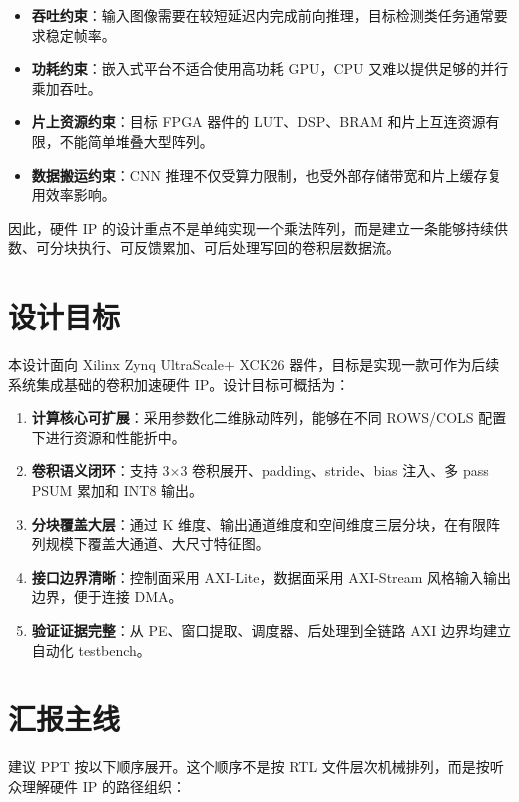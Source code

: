 \documentclass[fontset=fandol,ugly,language=chinese]{pkuthss}
\begin{document}
\begin{itemize}
    \item \textbf{吞吐约束}：输入图像需要在较短延迟内完成前向推理，目标检测类任务通常要求稳定帧率。
    \item \textbf{功耗约束}：嵌入式平台不适合使用高功耗 GPU，CPU 又难以提供足够的并行乘加吞吐。
    \item \textbf{片上资源约束}：目标 FPGA 器件的 LUT、DSP、BRAM 和片上互连资源有限，不能简单堆叠大型阵列。
    \item \textbf{数据搬运约束}：CNN 推理不仅受算力限制，也受外部存储带宽和片上缓存复用效率影响。
\end{itemize}

因此，硬件 IP 的设计重点不是单纯实现一个乘法阵列，而是建立一条能够持续供数、可分块执行、可反馈累加、可后处理写回的卷积层数据流。

\section{设计目标}

本设计面向 Xilinx Zynq UltraScale+ XCK26 器件，目标是实现一款可作为后续系统集成基础的卷积加速硬件 IP。设计目标可概括为：

\begin{enumerate}
    \item \textbf{计算核心可扩展}：采用参数化二维脉动阵列，能够在不同 ROWS/COLS 配置下进行资源和性能折中。
    \item \textbf{卷积语义闭环}：支持 3$\times$3 卷积展开、padding、stride、bias 注入、多 pass PSUM 累加和 INT8 输出。
    \item \textbf{分块覆盖大层}：通过 K 维度、输出通道维度和空间维度三层分块，在有限阵列规模下覆盖大通道、大尺寸特征图。
    \item \textbf{接口边界清晰}：控制面采用 AXI-Lite，数据面采用 AXI-Stream 风格输入输出边界，便于连接 DMA。
    \item \textbf{验证证据完整}：从 PE、窗口提取、调度器、后处理到全链路 AXI 边界均建立自动化 testbench。
\end{enumerate}

\section{汇报主线}

建议 PPT 按以下顺序展开。这个顺序不是按 RTL 文件层次机械排列，而是按听众理解硬件 IP 的路径组织：
\end{document}
